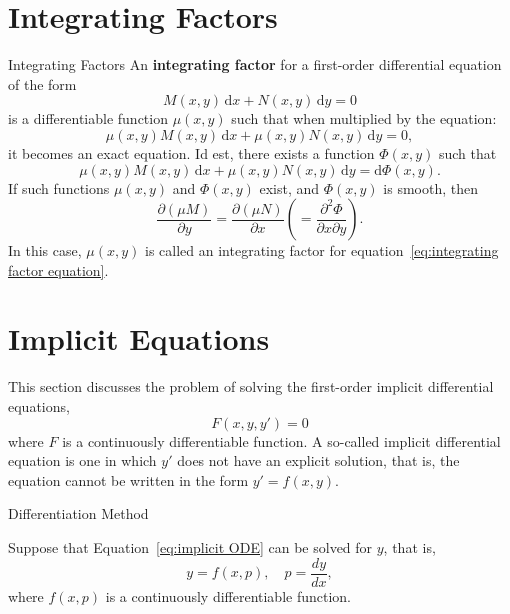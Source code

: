\documentclass[11pt]{elegantbook}
\begin{document}
\section{Integrating Factors}
\begin{definition}{Integrating Factors}
    An \textbf{integrating factor} for a first-order differential equation of the form
    \begin{equation}\label{eq:integrating factor equation}
        M(x, y) \, \mathrm{d}x + N(x, y) \, \mathrm{d}y = 0
    \end{equation}
    is a differentiable function \(\mu(x, y)\) such that when multiplied by the equation:
    \[
    \mu(x, y) M(x, y) \, \mathrm{d}x + \mu(x, y) N(x, y) \, \mathrm{d}y = 0,
    \]
    it becomes an exact equation.
    Id est, there exists a function \(\Phi(x, y)\) such that
    \[
       \mu(x, y) M(x, y) \, \mathrm{d}x + \mu(x, y) N(x, y) \, \mathrm{d}y = \mathrm{d}\Phi(x, y).
    \]
    If such functions \(\mu(x, y)\) and \(\Phi(x, y)\) exist, and \(\Phi(x, y)\) is smooth, then
    \[
    \frac{\partial(\mu M)}{\partial y} = \frac{\partial(\mu N)}{\partial x}\left( = \frac{\partial^2 \Phi}{\partial x \partial y} \right).
    \]
    In this case, \(\mu(x, y)\) is called an integrating factor for equation~\eqref{eq:integrating factor equation}.
\end{definition}


\section{Implicit Equations}
This section discusses the problem of solving the first-order implicit differential equations,
\begin{equation}\label{eq:implicit ODE}
F(x, y, y') = 0
\end{equation}
where \(F\) is a continuously differentiable function. 
A so-called implicit differential equation is one in which \(y'\) does not have an explicit solution, 
that is, the equation cannot be written in the form \(y' = f(x, y)\).

\begin{leftbarTitle}{Differentiation Method}\end{leftbarTitle}
Suppose that Equation~\eqref{eq:implicit ODE} can be solved for \(y\), that is,
\begin{equation}\label{eq:differentiation method}
    y = f(x, p),\quad p = \frac{dy}{dx},
\end{equation}
where \(f(x, p)\) is a continuously differentiable function.
\end{document}
